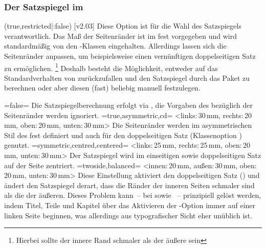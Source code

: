 \begin{DeclareEntity*}{}
\begin{DeclareEntity*}{}
\begin{DeclareEntity*}{}
\subsubsection{Der Satzspiegel im \TUDCD}
%
\begin{Declaration}
  {}
  (true,restricted|:false)
  [v2.03]
Diese Option ist für die Wahl des Satzspiegels verantwortlich. Das Maß der 
Seitenränder ist im \CD fest vorgegeben und wird standardmäßig von den 
\TUDScript-Klassen eingehalten. Allerdings lassen sich die Seitenränder 
anpassen, um beispielsweise einen vernünftigen doppelseitigen Satz zu 
ermöglichen.%
\footnote{Hierbei sollte der innere Rand schmaler als der äußere sein}
Deshalb besteht die Möglichkeit, entweder auf das Standardverhalten von 
\KOMAScript zurückzufallen und den Satzspiegel durch das Paket 
 zu berechnen oder aber diesen (fast) beliebig manuell 
festzulegen.
\begin{DeclareValues}
\itemval=false=
  Die Satzspiegelberechnung erfolgt via , die Vorgaben des 
  \CDs bezüglich der Seitenränder werden ignoriert.
\itemval*=true,asymmetric,cd=%
    <links:\,30\,mm, rechts:\,20\,mm, oben:\,20\,mm, unten:\,30\,mm>
  Die Seitenränder werden im asymmetrischen Stil des \CDs fest definiert und 
  auch für den doppelseitigen Satz (Klassenoption ) 
  genutzt.%
\itemval=symmetric,centred,centered=%
    <links:\,25\,mm, rechts:\,25\,mm, oben:\,20\,mm, unten:\,30\,mm>
  Der Satzspiegel wird im einseitigen sowie doppelseitigen Satz auf der Seite 
  zentriert.%
\itemval=twoside,balanced=%
    <innen:\,20\,mm, außen:\,30\,mm, oben:\,20\,mm, unten:\,30\,mm>
  Diese Einstellung aktiviert den doppelseitigen Satz () 
  und ändert den Satzspiegel derart, dass die Ränder der inneren Seiten 
  schmaler sind als die der äußeren.%
  Dieses Problem kann~-- bei  sowie ~-- 
  prinzipiell gelöst werden, indem Titel, Teile und Kapitel über das Aktivieren 
  der \KOMAScript-Option  immer auf einer linken Seite 
  beginnen, was allerdings aus typografischer Sicht eher unüblich ist.
\end{DeclareValues}


\end{Declaration}
\end{DeclareEntity*}
\end{DeclareEntity*}
\end{DeclareEntity*}
